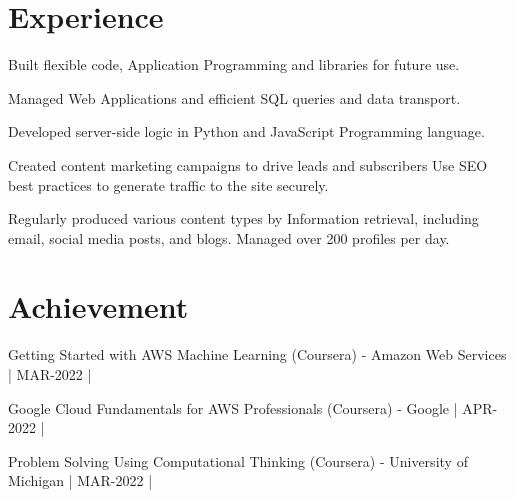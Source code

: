 \documentclass[]{mmynayak-resume-openfont}
\begin{document}
\begin{minipage}[t]{0.66\textwidth}

\section{Experience}
\begin{tightemize}
 \item Built flexible code, Application Programming and
libraries for future use.
\item Managed Web Applications and efficient SQL queries
and data transport.
\item Developed server-side logic in Python and JavaScript
Programming language.
\end{tightemize}
\sectionsep
{}
\begin{tightemize}
 \item Created content marketing campaigns to drive leads
and subscribers Use SEO best practices to generate
traffic to the site securely.
\item  Regularly produced various content types by
Information retrieval, including email, social media
posts, and blogs. Managed over 200 profiles per day.
\end{tightemize}
\sectionsep

\section{Achievement} 
\begin{tightemize}
\item Getting Started with AWS Machine Learning (Coursera) -
Amazon Web Services | MAR-2022 |
\item Google Cloud Fundamentals for AWS Professionals
(Coursera) - Google | APR-2022 |
\item Problem Solving Using Computational Thinking
(Coursera) - University of Michigan | MAR-2022 |


\end{tightemize}
\end{minipage}
\end{document}
